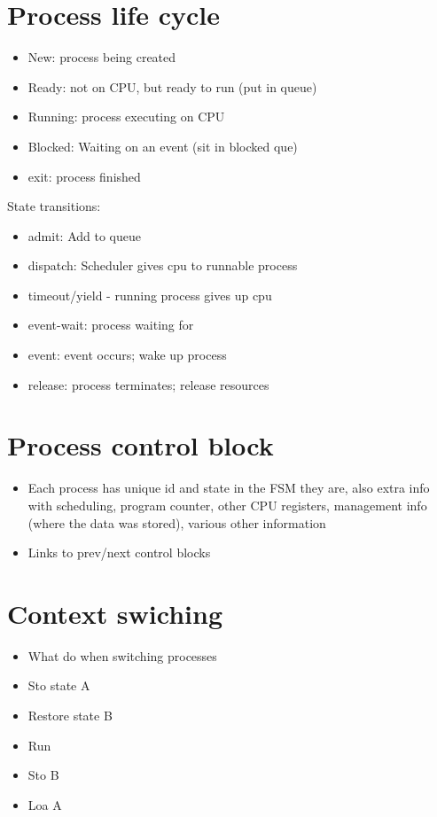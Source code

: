 \documentclass{article}[18pt]
\begin{document}
\section{Process life cycle}
\begin{itemize}
	\item New: process being created
	\item Ready: not on CPU, but ready to run (put in queue)
	\item Running: process executing on CPU
	\item Blocked: Waiting on an event (sit in blocked que)
	\item exit: process finished
\end{itemize}
State transitions:
\begin{itemize}
	\item admit: Add to queue
	\item dispatch: Scheduler gives cpu to runnable process
	\item timeout/yield  - running process gives up cpu
	\item event-wait: process waiting for
	\item event: event occurs; wake up process
	\item release: process terminates; release resources
\end{itemize}
\section{Process control block}
\begin{itemize}
	\item Each process has unique id and state in the FSM they are, also extra info with scheduling, program counter, other CPU registers, management info (where the data was stored), various other information
	\item Links to prev/next control blocks
\end{itemize}
\section{Context swiching}
\begin{itemize}
	\item What do when switching processes
	\item Sto state A
	\item Restore state B
	\item Run
	\item Sto B
	\item Loa A
\end{itemize}
\end{document}
